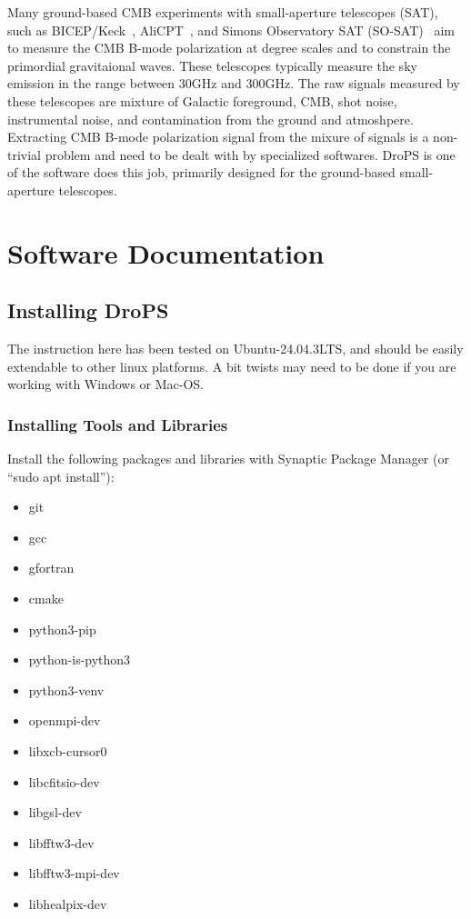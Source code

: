 \documentclass[12pt, a4paper]{ctexart} %
\begin{document}
Many ground-based CMB experiments with small-aperture telescopes (SAT), such as BICEP/Keck~\cite{BICEP}, AliCPT~\cite{AliCPT}, and Simons Observatory SAT (SO-SAT)~\cite{SO-SAT} aim to measure the CMB B-mode polarization at degree scales and to constrain the primordial gravitaional waves. These telescopes typically measure the sky emission in the range between $30\mathrm{GHz}$ and $300\mathrm{GHz}$. The raw signals measured by these telescopes are mixture of Galactic foreground, CMB, shot noise, instrumental noise, and contamination from the ground and atmoshpere. Extracting CMB B-mode polarization signal from the mixure of signals is a non-trivial problem and need to be dealt with by specialized softwares. DroPS is one of the software does this job, primarily designed for the ground-based small-aperture telescopes.

\section{Software Documentation}


\subsection{Installing DroPS}

The instruction here has been tested on Ubuntu-24.04.3LTS, and should be easily extendable to other linux platforms. A bit twists may need to be done if you are working with Windows or Mac-OS.

\subsubsection{Installing Tools and Libraries}

Install the following packages and libraries with Synaptic Package Manager (or ``sudo apt install''):

\begin{itemize}
  \item{git}
  \item{gcc}
  \item{gfortran}
  \item{cmake}
  \item{python3-pip}
  \item{python-is-python3}
  \item{python3-venv}
  \item{openmpi-dev}
  \item{libxcb-cursor0}
  \item{libcfitsio-dev}
  \item{libgsl-dev}
  \item{libfftw3-dev}
  \item{libfftw3-mpi-dev}
  \item{libhealpix-dev}
\end{itemize}
\end{document}

